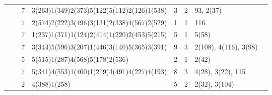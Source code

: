 \documentclass[]{article}
\begin{document}
\begin{longtable}{|c|c|rl|rrll|}
  &   &  7  &  3(263)1(349)2(373)5(122)5(112)2(126)1(538)  &  3  &  2 & 93, 2(37) & \\ 
  &   &  7  &  2(574)2(222)3(496)3(131)2(338)4(567)2(529)  &  1  &  1 & 116 & \\ 
  &   &  7  &  1(237)1(371)1(124)2(414)1(220)2(453)5(215)  &  5  &  1 & 5(58) & \\ 
  &   &  7  &  3(344)5(596)3(207)1(446)3(140)5(365)3(391)  &  9  &  3 & 2(108), 4(116), 3(98) & \\ 
  &   &  5  &  5(515)1(287)4(568)5(178)2(536)  &  2  &  1 & 2(42) & \\ 
  &   &  7  &  5(341)4(553)1(400)1(219)4(491)4(227)4(193)  &  8  &  3 & 4(28), 3(22), 115 & \\ 
  &   &  2  &  4(388)1(258)  &  5  &  2 & 2(32), 3(104) & \\ 
\hline
   \end{longtable}
\end{document}
